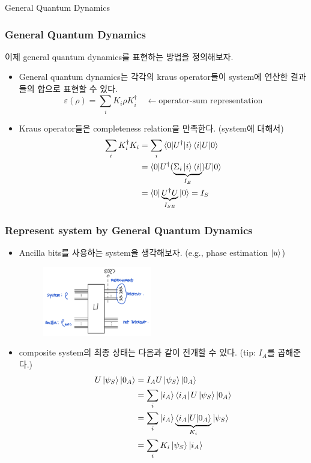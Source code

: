\documentclass[9pt]{beamer}
\begin{document}
\begin{section}{General Quantum Dynamics}
        \begin{frame}
            \frametitle{General Quantum Dynamics}
            이제 general quantum dynamics를 표현하는 방법을 정의해보자.
            \begin{itemize}
                \item General quantum dynamics는 각각의 kraus operator들이 system에 연산한 결과들의 합으로 표현할 수 있다.
                $$ \varepsilon (\rho) = \sum_i K_i \rho K_i^\dagger  \quad \leftarrow \text{operator-sum representation}$$
                \item Kraus operator들은 completeness relation을 만족한다. (system에 대해서)
                \begin{align*} \sum_i K_i ^\dagger K_i 
                    &= \sum_i \braket{0|U^\dagger |i} \braket{i|U | 0} \\ &= \braket{0|U^\dagger(\underbrace{\Sigma_i \ket i \bra i}_{I_E}) U |0} \\ &= \braket{0|\underbrace{U^\dagger U}_{I_{SE}}|0} = I_S\end{align*}
            \end{itemize}
        \end{frame}

        \begin{frame}
            \frametitle{Represent system by General Quantum Dynamics}
            \begin{itemize}
                \item Ancilla bits를 사용하는 system을 생각해보자. (e.g., phase estimation $\ket u$)
                \begin{figure}
                    \includegraphics[width=0.45\textwidth]{image/L3_ancilla.png}
                \end{figure}
                \item composite system의 최종 상태는 다음과 같이 전개할 수 있다. (tip: $I_A$를 곱해준다.)
                \begin{align*} U\ket{\psi_S} \ket{0_A} &= I_A U \ket{\psi_S} \ket{0_A}
                    \\ &= \sum_i \ket{i_A} \bra{i_A}U \ket{\psi_S} \ket{0_A} \\ &= \sum_i \ket{i_A} \underbrace{\braket{i_A|U|0_A}}_{K_i} \ket{\psi_S} \\ &= \sum_i K_i \ket{\psi_S} \ket{i_A}\end{align*}
            \end{itemize}
        \end{frame}


\end{section}
\end{document}
